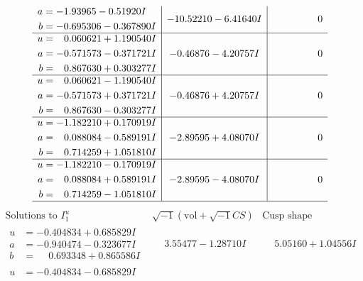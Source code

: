 \documentclass[1p]{elsarticle_modified}
\theoremstyle{definition}
\newcommand{\I}{\sqrt{-1}}
\begin{document}
$$\begin{array}{c|c|c}
\begin{aligned}
a &= -1.93965 - 0.51920 I \\
b &= -0.695306 - 0.367890 I\end{aligned}
 & -10.52210 - 6.41640 I & \phantom{-0.000000 } 0 \\ \hline\begin{aligned}
u &= \phantom{-}0.060621 + 1.190540 I \\
a &= -0.571573 - 0.371721 I \\
b &= \phantom{-}0.867630 + 0.303277 I\end{aligned}
 & -0.46876 - 4.20757 I & \phantom{-0.000000 } 0 \\ \hline\begin{aligned}
u &= \phantom{-}0.060621 - 1.190540 I \\
a &= -0.571573 + 0.371721 I \\
b &= \phantom{-}0.867630 - 0.303277 I\end{aligned}
 & -0.46876 + 4.20757 I & \phantom{-0.000000 } 0 \\ \hline\begin{aligned}
u &= -1.182210 + 0.170919 I \\
a &= \phantom{-}0.088084 - 0.589191 I \\
b &= \phantom{-}0.714259 + 1.051810 I\end{aligned}
 & -2.89595 + 4.08070 I & \phantom{-0.000000 } 0 \\ \hline\begin{aligned}
u &= -1.182210 - 0.170919 I \\
a &= \phantom{-}0.088084 + 0.589191 I \\
b &= \phantom{-}0.714259 - 1.051810 I\end{aligned}
 & -2.89595 - 4.08070 I & \phantom{-0.000000 } 0\\
 \hline 
 \end{array}$$\newpage$$\begin{array}{c|c|c}  
\text{Solutions to }I^u_{1}& \I (\text{vol} + \sqrt{-1}CS) & \text{Cusp shape}\\
 \hline 
\begin{aligned}
u &= -0.404834 + 0.685829 I \\
a &= -0.940474 - 0.323677 I \\
b &= \phantom{-}0.693348 + 0.865586 I\end{aligned}
 & \phantom{-}3.55477 - 1.28710 I & \phantom{-}5.05160 + 1.04556 I \\ \hline\begin{aligned}
u &= -0.404834 - 0.685829 I \\

\end{aligned}
\end{array}$$
\end{document}
